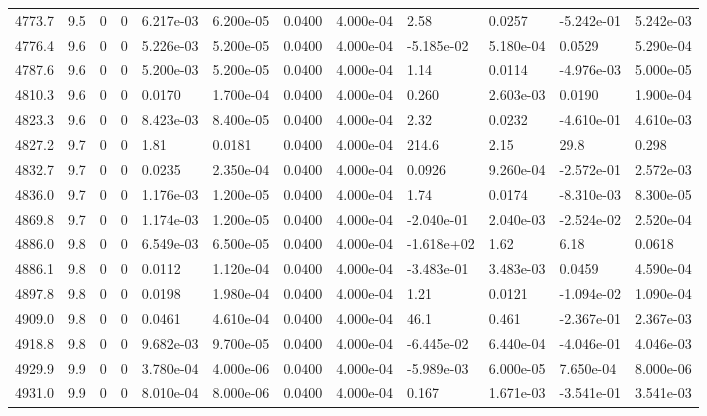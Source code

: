 \documentclass[preview]{standalone}
\begin{document}
{{{{{{{{{{{{\begin{tabular}{L{1.2cm}C{1.2cm} C{0.3cm}C{0.5cm} C{1.4cm}C{1.4cm} C{1.4cm}C{1.4cm} C{1.6cm}C{1.6cm} C{1.6cm}C{1.6cm}}
  4773.7  &   9.5  & 0     &  0 &  6.217e-03  & 6.200e-05  &  0.0400&   4.000e-04& 2.58 & 0.0257   &  -5.242e-01 & 5.242e-03  \\ 
  4776.4  &   9.6  & 0     &  0 &  5.226e-03  & 5.200e-05  &  0.0400&   4.000e-04& -5.185e-02 & 5.180e-04   &  0.0529 & 5.290e-04  \\ 
  4787.6  &   9.6  & 0     &  0 &  5.200e-03  & 5.200e-05  &  0.0400&   4.000e-04& 1.14 & 0.0114   &  -4.976e-03 & 5.000e-05  \\ 
  4810.3  &   9.6  & 0     &  0 &  0.0170  & 1.700e-04  &  0.0400&   4.000e-04& 0.260 & 2.603e-03   &  0.0190 & 1.900e-04  \\ 
  4823.3  &   9.6  & 0     &  0 &  8.423e-03  & 8.400e-05  &  0.0400&   4.000e-04& 2.32 & 0.0232   &  -4.610e-01 & 4.610e-03  \\ 
  4827.2  &   9.7  & 0     &  0 &  1.81  & 0.0181  &  0.0400&   4.000e-04& 214.6 & 2.15   &  29.8 & 0.298  \\ 
  4832.7  &   9.7  & 0     &  0 &  0.0235  & 2.350e-04  &  0.0400&   4.000e-04& 0.0926 & 9.260e-04   &  -2.572e-01 & 2.572e-03  \\ 
  4836.0  &   9.7  & 0     &  0 &  1.176e-03  & 1.200e-05  &  0.0400&   4.000e-04& 1.74 & 0.0174   &  -8.310e-03 & 8.300e-05  \\ 
  4869.8  &   9.7  & 0     &  0 &  1.174e-03  & 1.200e-05  &  0.0400&   4.000e-04& -2.040e-01 & 2.040e-03   &  -2.524e-02 & 2.520e-04  \\ 
  4886.0  &   9.8  & 0     &  0 &  6.549e-03  & 6.500e-05  &  0.0400&   4.000e-04& -1.618e+02 & 1.62   &  6.18 & 0.0618  \\ 
  4886.1  &   9.8  & 0     &  0 &  0.0112  & 1.120e-04  &  0.0400&   4.000e-04& -3.483e-01 & 3.483e-03   &  0.0459 & 4.590e-04  \\ 
  4897.8  &   9.8  & 0     &  0 &  0.0198  & 1.980e-04  &  0.0400&   4.000e-04& 1.21 & 0.0121   &  -1.094e-02 & 1.090e-04  \\ 
  4909.0  &   9.8  & 0     &  0 &  0.0461  & 4.610e-04  &  0.0400&   4.000e-04& 46.1 & 0.461   &  -2.367e-01 & 2.367e-03  \\ 
  4918.8  &   9.8  & 0     &  0 &  9.682e-03  & 9.700e-05  &  0.0400&   4.000e-04& -6.445e-02 & 6.440e-04   &  -4.046e-01 & 4.046e-03  \\ 
  4929.9  &   9.9  & 0     &  0 &  3.780e-04  & 4.000e-06  &  0.0400&   4.000e-04& -5.989e-03 & 6.000e-05   &  7.650e-04 & 8.000e-06  \\ 
  4931.0  &   9.9  & 0     &  0 &  8.010e-04  & 8.000e-06  &  0.0400&   4.000e-04& 0.167 & 1.671e-03   &  -3.541e-01 & 3.541e-03  \\ 

\end{tabular}}}}}}}}}}}}}
\end{document}
